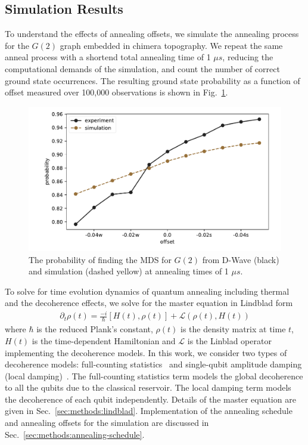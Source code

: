 \documentclass[prd,twocolumn,tightenlines,preprintnumbers,showpacs,superscriptaddress,notitlepage,nofootinbib,eqsecnum,floatfix,longbibliography,aps,10pt]{revtex4-1}
\begin{document}
\subsection{Simulation Results}
\label{sec:results:simulation}
To understand the effects of annealing offsets, we simulate the annealing process for the $G(2)$ graph embedded in chimera topography.
We repeat the same anneal process with a shortend total annealing time of 1 $\mu s$, reducing the computational demands of the simulation, and count the number of correct ground state occurrences.
The resulting ground state probability as a function of offset measured over 100,000 observations is shown in Fig.~\ref{fig:dwave1us}.

\begin{figure}[b]
	\centering
	\includegraphics[width=\columnwidth]{./NN2_offset_scaling.pdf}
	\caption{The probability of finding the MDS for $G(2)$ from D-Wave (black) and simulation (dashed yellow) at annealing times of 1 $\mu s$.}
	\label{fig:dwave1us}
\end{figure}


To solve for time evolution dynamics of quantum annealing including thermal and the decoherence effects, we solve for the master equation in Lindblad form
\begin{align}
 \label{eq:sim:linblad-eq}
 \partial_t \rho (t) =  \frac{-i}{\hbar} [H(t) , \rho(t)] + \mathcal{L}(\rho(t), H(t))
\end{align}
where $\hbar$ is the reduced Plank's constant, $\rho (t)$ is the density matrix at time $t$, $H(t)$ is the time-dependent Hamiltonian and $\mathcal{L}$ is the Linblad operator implementing the decoherence models.
In this work, we consider two types of decoherence models: full-counting statistics~\cite{PhysRevE.90.022103,RevModPhys.81.1665} and single-qubit amplitude damping (local damping)~\cite{10.5555/1972505,preskill1998lecture}.
The full-counting statistics term models the global decoherence to all the qubits due to the classical reservoir.
The local damping term models the decoherence of each qubit independently.
Details of the master equation are given in Sec.~\ref{sec:methods:lindblad}.
Implementation of the annealing schedule and annealing offsets for the simulation are discussed in Sec.~\ref{sec:methods:annealing-schedule}.
\end{document}
